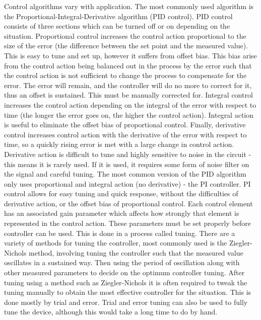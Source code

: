 \documentclass[a4]{report}
\begin{document}
	Control algorithms vary with application. The most commonly used algorithm is the Proportional-Integral-Derivative algorithm (PID control). PID control consists of three sections which can be turned off or on depending on the situation. 
	Proportional control increases the control action proportional to the size of the error (the difference between the set point and the measured value). This is easy to tune and set up, however it suffers from offset bias. This bias arise from the control action being balanced out in the process by the error such that the control action is not sufficient to change the process to compensate for the error. The error will remain, and the controller will do no more to correct for it, thus an offset is sustained. This must be manually corrected for.
	Integral control increases the control action depending on the integral of the error with respect to time (the longer the error goes on, the higher the control action). Integral action is useful to eliminate the offset bias of proportional control.
	Finally, derivative control increases control action with the derivative of the error with respect to time, so a quickly rising error is met with a large change in control action. Derivative action is difficult to tune and highly sensitive to noise in the circuit - this means it is rarely used. If it is used, it requires some form of noise filter on the signal and careful tuning. The most common version of the PID algorithm only uses proportional and integral action (no derivative) - the PI controller. PI control allows for easy tuning and quick response, without the difficulties of derivative action, or the offset bias of proportional control.\newline \newline \noindent
	Each control element has an associated gain parameter which affects how strongly that element is represented in the control action. These parameters must be set properly before controller can be used. This is done in a process called tuning. There are a variety of methods for tuning the controller, most commonly used is the Ziegler-Nichols method, involving tuning the controller such that the measured value oscillates in a sustained way. Then using the period of oscillation along with other measured parameters to decide on the optimum controller tuning. After tuning using a method such as Ziegler-Nichols it is often required to tweak the tuning manually to obtain the most effective controller for the situation. This is done mostly by trial and error. Trial and error tuning can also be used to fully tune the device, although this would take a long time to do by hand. \newline \newline \noindent
\end{document}
